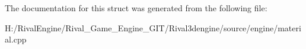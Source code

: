 The documentation for this struct was generated from the following file\+:\begin{DoxyCompactItemize}
\item 
H\+:/\+Rival\+Engine/\+Rival\+\_\+\+Game\+\_\+\+Engine\+\_\+\+G\+I\+T/\+Rival3dengine/source/engine/material.\+cpp\end{DoxyCompactItemize}

